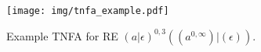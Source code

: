 \documentclass[AMA,STIX1COL]{WileyNJD-v2}
\begin{document}
\begin{figure}\label{fig_tnfa_example}
\texttt{[image: img/tnfa\_example.pdf]}
\caption{
    Example TNFA for RE $(a|\epsilon)^{0,3}((a^{0,\infty})|(\epsilon))$.
}
\end{figure}



\FloatBarrier

\end{document}
